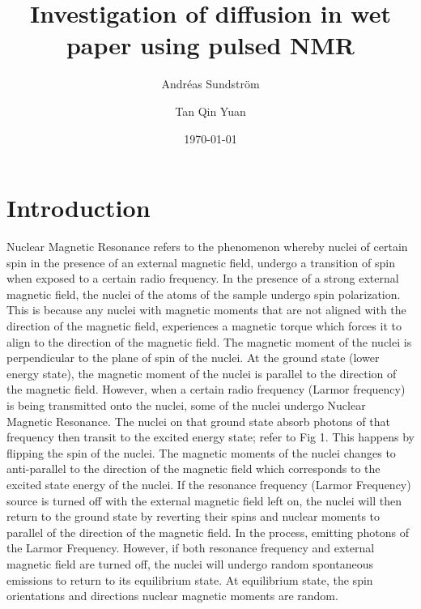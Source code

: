 \documentclass[11pt,a4paper, twocolumn,
swedish, english %
]{article}
\begin{document}


\title{Investigation of diffusion in wet paper using pulsed NMR}
\author{Andréas Sundström \and Tan Qin Yuan}
\date{\today}

\twocolumn[
\begin{@twocolumnfalse}
\maketitle
\begin{abstract}

\end{abstract}
\end{@twocolumnfalse}
]




\section{Introduction}

Nuclear Magnetic Resonance refers to the phenomenon whereby nuclei of certain spin in the presence of an external magnetic field, undergo a transition of spin when exposed to a certain radio frequency. In the presence of a strong external magnetic field, the nuclei of the atoms of the sample undergo spin polarization. This is because any nuclei with magnetic moments that are not aligned with the direction of the magnetic field, experiences a magnetic torque which forces it to align to the direction of the magnetic field. The magnetic moment of the nuclei is perpendicular to the plane of spin of the nuclei. At the ground state (lower energy state), the magnetic moment of the nuclei is parallel to the direction of the magnetic field. However, when a certain radio frequency (Larmor frequency) is being transmitted onto the nuclei, some of the nuclei undergo Nuclear Magnetic Resonance. The nuclei on that ground state absorb photons of that frequency then transit to the excited energy state; refer to Fig 1. This happens by flipping the spin of the nuclei. The magnetic moments of the nuclei changes to anti-parallel to the direction of the magnetic field which corresponds to the excited state energy of the nuclei. If the resonance frequency (Larmor Frequency) source is turned off with the external magnetic field left on, the nuclei will then return to the ground state by reverting their spins and nuclear moments to parallel of the direction of the magnetic field. In the process, emitting photons of the Larmor Frequency. However, if both resonance frequency and external magnetic field are turned off, the nuclei will undergo random spontaneous emissions to return to its equilibrium state. At equilibrium state, the spin orientations and directions nuclear magnetic moments are random.   
\end{document}
